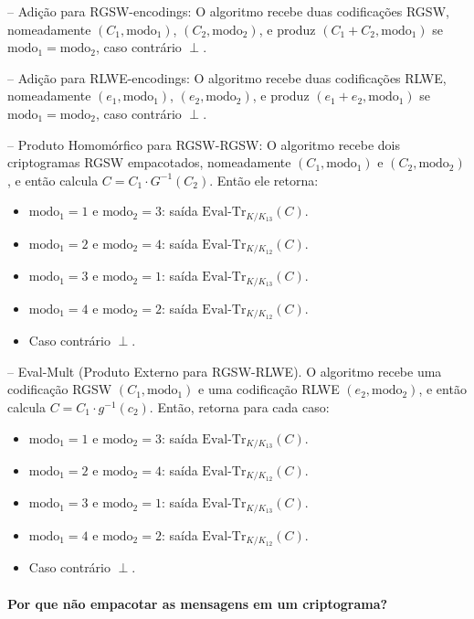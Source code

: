 -- Adição para RGSW-encodings: O algoritmo recebe duas codificações RGSW, nomeadamente $(C_1, \text{modo}_1)$, $(C_2, \text{modo}_2)$, e produz $(C_1 + C_2, \text{modo}_1)$ se $\text{modo}_1 = \text{modo}_2$, caso contrário $\perp$.

-- Adição para RLWE-encodings: O algoritmo recebe duas codificações RLWE, nomeadamente $(e_1, \text{modo}_1)$, $(e_2, \text{modo}_2)$, e produz $(e_1 + e_2, \text{modo}_1)$ se $\text{modo}_1 = \text{modo}_2$, caso contrário $\perp$.

-- Produto Homomórfico para RGSW-RGSW: O algoritmo recebe dois criptogramas RGSW empacotados, nomeadamente $(C_1, \text{modo}_1)$ e $(C_2, \text{modo}_2)$, e então calcula $C = C_1 \cdot G^{-1}(C_2)$. Então ele retorna:

\begin{itemize}
    \item $\text{modo}_1 = 1 \text{ e } \text{modo}_2 = 3$: saída $\text{Eval-Tr}_{K/K_{13}}(C)$.
    \item $\text{modo}_1 = 2 \text{ e } \text{modo}_2 = 4$: saída $\text{Eval-Tr}_{K/K_{12}}(C)$.
    \item $\text{modo}_1 = 3 \text{ e } \text{modo}_2 = 1$: saída $\text{Eval-Tr}_{K/K_{13}}(C)$.
    \item $\text{modo}_1 = 4 \text{ e } \text{modo}_2 = 2$: saída $\text{Eval-Tr}_{K/K_{12}}(C)$.
    \item Caso contrário $\perp$.
\end{itemize}
-- Eval-Mult (Produto Externo para RGSW-RLWE). O algoritmo recebe uma codificação RGSW $(C_1, \text{modo}_1)$ e uma codificação RLWE $(e_2, \text{modo}_2)$, e então calcula $C = C_1 \cdot g^{-1}(c_2)$. Então, retorna para cada caso:
\begin{itemize}
    \item $\text{modo}_1 = 1 \text{ e } \text{modo}_2 = 3$: saída $\text{Eval-Tr}_{K/K_{13}}(C)$.
    \item $\text{modo}_1 = 2 \text{ e } \text{modo}_2 = 4$: saída $\text{Eval-Tr}_{K/K_{12}}(C)$.
    \item $\text{modo}_1 = 3 \text{ e } \text{modo}_2 = 1$: saída $\text{Eval-Tr}_{K/K_{13}}(C)$.
    \item $\text{modo}_1 = 4 \text{ e } \text{modo}_2 = 2$: saída $\text{Eval-Tr}_{K/K_{12}}(C)$.
    \item Caso contrário $\perp$.
\end{itemize}


\paragraph{Por que não empacotar as mensagens em um criptograma?}

